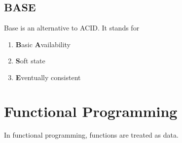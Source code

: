 \documentclass[oneside]{book}
\begin{document}
\section{BASE}
Base is an alternative to ACID.
It stands for

\begin{enumerate}
  \item \textbf{B}asic \textbf{A}vailability
  \item \textbf{S}oft state
  \item \textbf{E}ventually consistent
\end{enumerate}

\chapter{Functional Programming}
In functional programming, functions are treated as data.

\printbibliography
\end{document}
